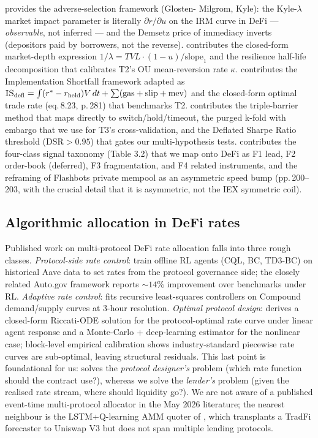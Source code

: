 \cite{ohara1995} provides the adverse-selection framework (Glosten-
Milgrom, Kyle): the Kyle-$\lambda$ market impact parameter is
literally $\partial r / \partial u$ on the IRM curve in DeFi ---
\emph{observable}, not inferred --- and the Demsetz price of
immediacy inverts (depositors paid by borrowers, not the reverse).
\cite{krause2005} contributes the closed-form market-depth
expression $1/\lambda = TVL \cdot (1 - u) / \text{slope}_{1}$ and
the resilience half-life decomposition that calibrates T2's OU
mean-reversion rate $\kappa$.  \cite{kissell2014} contributes the
Implementation Shortfall framework adapted as
$\textsc{IS}_{\text{defi}} = \int (r^{*} - r_{\text{held}}) V \, dt
+ \sum (\text{gas} + \text{slip} + \text{mev})$ and the
closed-form optimal trade rate (eq.\,8.23, p.\,281) that benchmarks
T2.  \cite{lopezdeprado2018} contributes the triple-barrier method
that maps directly to switch/hold/timeout, the purged k-fold with
embargo that we use for T3's cross-validation, and the Deflated
Sharpe Ratio threshold ($\text{DSR} > 0.95$) that gates our
multi-hypothesis tests.  \cite{mackenzie2021} contributes the
four-class signal taxonomy (Table 3.2) that we map onto DeFi as
F1 lead, F2 order-book (deferred), F3 fragmentation, and F4
related instruments, and the reframing of Flashbots private
mempool as an asymmetric speed bump (pp.\,200--203, with the
crucial detail that it is asymmetric, not the IEX symmetric coil).

\subsection{Algorithmic allocation in DeFi rates}
\label{sec:bg-forecasting}

Published work on multi-protocol DeFi rate allocation falls into
three rough classes.  \emph{Protocol-side rate control}:
\cite{bertucci2025rl} train offline RL agents (CQL, BC, TD3-BC) on
historical Aave data to set rates from the protocol governance
side; the closely related Auto.gov framework \cite{xu2023autogov}
reports $\sim 14\%$ improvement over benchmarks under RL.
\emph{Adaptive rate control}: \cite{agilerate2024} fits recursive
least-squares controllers on Compound demand/supply curves at
3-hour resolution.  \emph{Optimal protocol design}:
\cite{baude2025optimal} derives a closed-form Riccati-ODE solution
for the protocol-optimal rate curve under linear agent response
and a Monte-Carlo + deep-learning estimator for the nonlinear case;
block-level empirical calibration shows industry-standard
piecewise rate curves are sub-optimal, leaving structural
residuals.  This last point is foundational for us:
\cite{baude2025optimal} solves the \emph{protocol designer's}
problem (which rate function should the contract use?), whereas we
solve the \emph{lender's} problem (given the realised rate stream,
where should liquidity go?).  We are not aware of a published
event-time multi-protocol allocator in the May 2026 literature;
the nearest neighbour is the LSTM+Q-learning AMM quoter of
\cite{predamm2024}, which transplants a TradFi forecaster to
Uniswap V3 but does not span multiple lending protocols.

